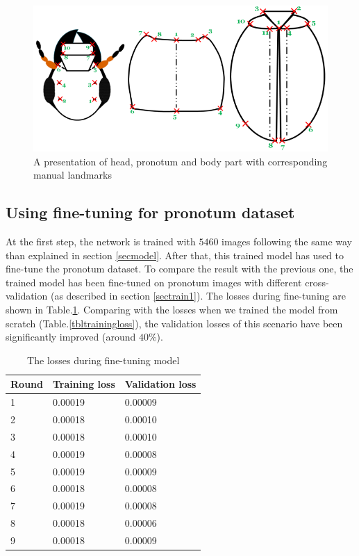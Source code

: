 \documentclass[10pt]{article}
\begin{document}
\begin{figure}[htbp]
        \centering
        \includegraphics[scale=0.3]{images/merge}
    \caption{\small{A presentation of head, pronotum and body part with corresponding manual landmarks}} 
    \label{figshape3parts}
\end{figure}

\subsection{Using fine-tuning for pronotum dataset}
At the first step, the network is trained with $5460$ images following
the same way than explained in section \ref{secmodel}. After that, 
this trained model has used to fine-tune the pronotum dataset. To compare the result with
the previous one, the trained model has been fine-tuned on pronotum images with different cross-validation (as described in section \ref{sectrain1}). The losses during fine-tuning are shown in
Table.\ref{tblfinetuningloss}. Comparing with the losses when we
trained the model from scratch (Table.\ref{tbltrainingloss}), the
validation losses of this scenario have been significantly improved (around
$40\%$).
\begin{table}[h!]
	\centering
	\begin{tabular}{l l l}
	Round & Training loss & Validation loss \\ \hline
	1 & 0.00019 & 0.00009  \\ \hline
	2 & 0.00018 & 0.00010 \\ \hline
	3 & 0.00018 & 0.00010 \\ \hline
	4 & 0.00019 & 0.00008 \\ \hline
	5 & 0.00019 & 0.00009 \\ \hline
	6 & 0.00018 & 0.00008 \\ \hline
	7 & 0.00019 & 0.00008 \\ \hline
	8 & 0.00018 & 0.00006 \\ \hline
	9 & 0.00018 & 0.00009 \\ \hline
	\end{tabular}
	\caption{\small{The losses during fine-tuning model}}
	\label{tblfinetuningloss}
\end{table}
\end{document}
